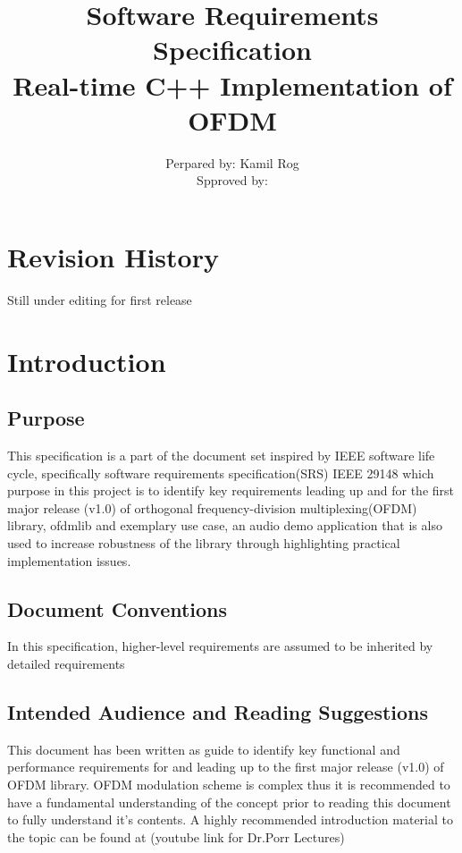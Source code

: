 \documentclass[]{report}
\title{ Software Requirements Specification \\ Real-time C++ Implementation of OFDM}
\author{Perpared by: Kamil Rog \\ Spproved by: }
\begin{document}
\maketitle

\pagebreak

\section*{Revision History}
Still under editing for first release
\pagebreak

\tableofcontents
\thispagestyle{empty}
\pagebreak

\cleardoublepage
{}

\pagebreak

\renewcommand{\thesection}{\arabic{section}}

\setlength{\parindent}{0em}
\setlength{\parskip}{0em}

\section{Introduction}

\subsection{Purpose}

This specification is a part of the document set inspired by IEEE software life cycle, specifically software requirements specification(SRS) IEEE 29148 which purpose in this project is to identify key requirements leading up and for the first major release (v1.0) of orthogonal frequency-division multiplexing(OFDM) library, ofdmlib and exemplary use case, an audio demo application that is also used to increase robustness of the library through highlighting practical implementation issues.


\subsection{Document Conventions}

In this specification, higher-level requirements are assumed to be inherited by detailed requirements


\subsection{Intended Audience and Reading Suggestions}

This document has been written as guide to identify key functional and performance requirements for and leading up to the first major release (v1.0) of OFDM library. OFDM modulation scheme is complex thus it is recommended to have a fundamental understanding of the concept prior to reading this document to fully understand it's contents. A highly recommended introduction material to the topic can be found at (youtube link for Dr.Porr Lectures)
\end{document}
